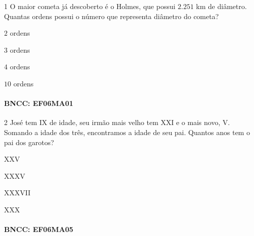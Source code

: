 
\num{1}  O maior cometa já descoberto é o Holmes, que possui $2.251$ km de
diâmetro. Quantas ordens possui o número que representa diâmetro do cometa?

\begin{escolha}
\item $2$ ordens
\item $3$ ordens
\item $4$ ordens
\item $10$ ordens
\end{escolha}

\paragraph{BNCC: EF06MA01}




\num{2}  José tem IX de idade, seu irmão mais velho tem XXI e o mais novo, V.
Somando a idade dos três, encontramos a idade de seu pai. Quantos anos
tem o pai dos garotos?

\begin{escolha}
\item XXV
\item XXXV
\item XXXVII
\item XXX
\end{escolha}

\paragraph{BNCC: EF06MA05}


